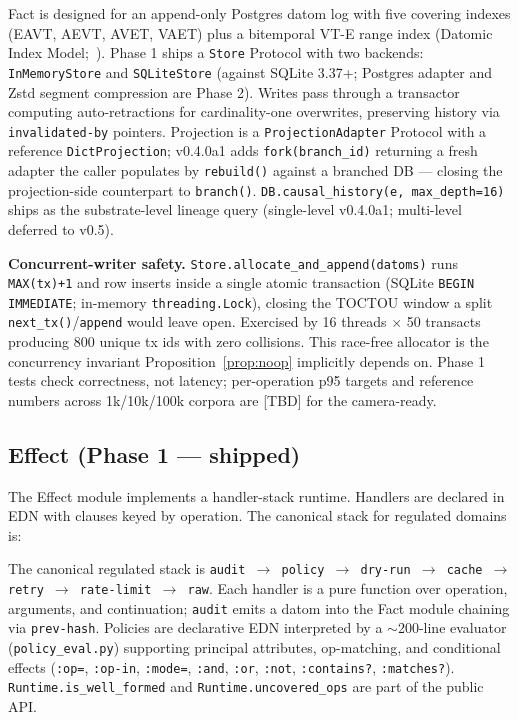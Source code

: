 \documentclass[anon]{nesy2026}   %
\newcommand{\C}[1]{\texttt{#1}}
\begin{document}
Fact is designed for an append-only Postgres datom log with five covering indexes (EAVT, AEVT, AVET, VAET) plus a bitemporal VT-E range index (Datomic Index Model;~\citealp{tonsky2023datomic}). Phase 1 ships a \C{Store} Protocol with two backends: \C{InMemoryStore} and \C{SQLiteStore} (against SQLite 3.37+; Postgres adapter and Zstd segment compression are Phase 2). Writes pass through a transactor computing auto-retractions for cardinality-one overwrites, preserving history via \C{invalidated-by} pointers. Projection is a \C{ProjectionAdapter} Protocol with a reference \C{DictProjection}; v0.4.0a1 adds \C{fork(branch\_id)} returning a fresh adapter the caller populates by \C{rebuild()} against a branched DB --- closing the projection-side counterpart to \C{branch()}. \C{DB.causal\_history(e, max\_depth=16)} ships as the substrate-level lineage query (single-level v0.4.0a1; multi-level deferred to v0.5).

\textbf{Concurrent-writer safety.} \C{Store.allocate\_and\_append(datoms)} runs \C{MAX(tx)+1} and row inserts inside a single atomic transaction (SQLite \C{BEGIN IMMEDIATE}; in-memory \C{threading.Lock}), closing the TOCTOU window a split \C{next\_tx()}/\C{append} would leave open. Exercised by 16 threads $\times$ 50 transacts producing 800 unique tx ids with zero collisions. This race-free allocator is the concurrency invariant Proposition~\ref{prop:noop} implicitly depends on. Phase 1 tests check correctness, not latency; per-operation p95 targets and reference numbers across 1k/10k/100k corpora are [TBD] for the camera-ready.

\subsection{Effect (Phase 1 --- shipped)}\label{sec:impl-effect}

The Effect module implements a handler-stack runtime. Handlers are declared in EDN with clauses keyed by operation. The canonical stack for regulated domains is:

The canonical regulated stack is \C{audit $\to$ policy $\to$ dry-run $\to$ cache $\to$ retry $\to$ rate-limit $\to$ raw}. Each handler is a pure function over operation, arguments, and continuation; \C{audit} emits a datom into the Fact module chaining via \C{prev-hash}. Policies are declarative EDN interpreted by a $\sim$200-line evaluator (\C{policy\_eval.py}) supporting principal attributes, op-matching, and conditional effects (\C{:op=}, \C{:op-in}, \C{:mode=}, \C{:and}, \C{:or}, \C{:not}, \C{:contains?}, \C{:matches?}). \C{Runtime.is\_well\_formed} and \C{Runtime.uncovered\_ops} are part of the public API.
\end{document}
